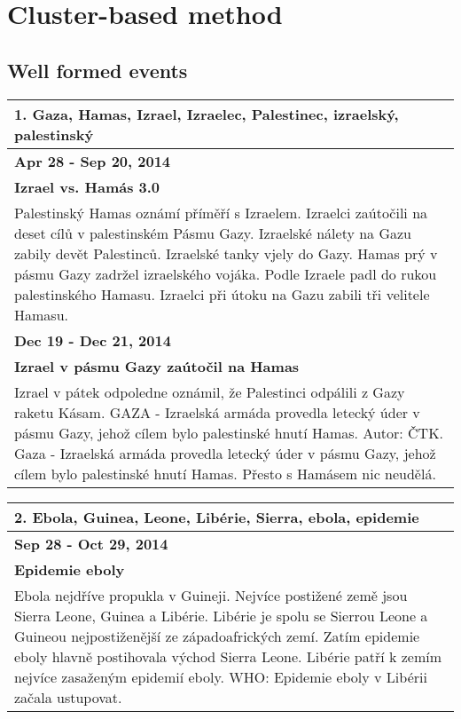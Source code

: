 \section{Cluster-based method}
\subsection*{Well formed events}
\begin{tabularx}{\linewidth}{p{\linewidth}} \toprule[1.5pt]
\bf 1. Gaza, Hamas, Izrael, Izraelec, Palestinec, izraelský, palestinský \\ \midrule
\bf Apr 28 - Sep 20, 2014 \\ \midrule
\bf Izrael vs. Hamás 3.0 \\
Palestinský Hamas oznámí příměří s Izraelem. Izraelci zaútočili na deset cílů v palestinském Pásmu Gazy. Izraelské nálety na Gazu zabily devět Palestinců. Izraelské tanky vjely do Gazy. Hamas prý v pásmu Gazy zadržel izraelského vojáka. Podle Izraele padl do rukou palestinského Hamasu. Izraelci při útoku na Gazu zabili tři velitele Hamasu. \\ \bottomrule[1.25pt]

\bf Dec 19 - Dec 21, 2014 \\ \midrule
\bf Izrael v pásmu Gazy zaútočil na Hamas \\
Izrael v pátek odpoledne oznámil, že Palestinci odpálili z Gazy raketu Kásam. GAZA - Izraelská armáda provedla letecký úder v pásmu Gazy, jehož cílem bylo palestinské hnutí Hamas. Autor: ČTK. Gaza - Izraelská armáda provedla letecký úder v pásmu Gazy, jehož cílem bylo palestinské hnutí Hamas. Přesto s Hamásem nic neudělá. \\ \bottomrule[1.25pt]
\end{tabularx}

\hspace{\fill}

\begin{tabularx}{\linewidth}{p{\linewidth}} \toprule[1.5pt]
\bf 2. Ebola, Guinea, Leone, Libérie, Sierra, ebola, epidemie \\ \midrule
\bf Sep 28 - Oct 29, 2014 \\ \midrule
\bf Epidemie eboly \\
Ebola nejdříve propukla v Guineji. Nejvíce postižené země jsou Sierra Leone, Guinea a Libérie. Libérie je spolu se Sierrou Leone a Guineou nejpostiženější ze západoafrických zemí. Zatím epidemie eboly hlavně postihovala východ Sierra Leone. Libérie patří k zemím nejvíce zasaženým epidemií eboly. WHO: Epidemie eboly v Libérii začala ustupovat. \\ \bottomrule[1.25pt]
\end{tabularx}
\hspace{\fill}

